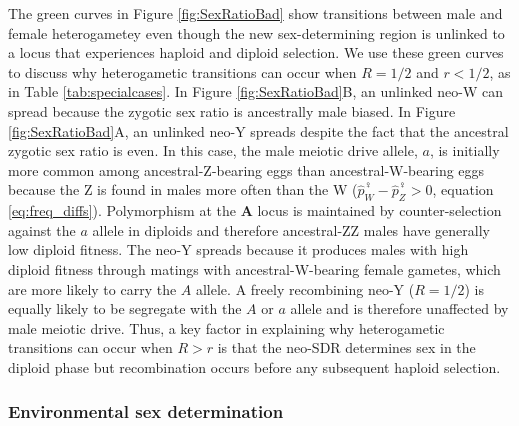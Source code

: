 \documentclass[12pt]{article}
\begin{document}
The green curves in Figure \ref{fig:SexRatioBad} show transitions between male and female heterogametey even though the new sex-determining region is unlinked to a locus that experiences haploid and diploid selection. 
We use these green curves to discuss why heterogametic transitions can occur when $R=1/2$ and $r<1/2$, as in Table \ref{tab:specialcases}.
In Figure \ref{fig:SexRatioBad}B, an unlinked neo-W can spread because the zygotic sex ratio is ancestrally male biased. 
In Figure \ref{fig:SexRatioBad}A, an unlinked neo-Y spreads despite the fact that the ancestral zygotic sex ratio is even. 
In this case, the male meiotic drive allele, $a$, is initially more common among ancestral-Z-bearing eggs than ancestral-W-bearing eggs because the Z is found in males more often than the W ($\hat{p}_{W}^\female-\hat{p}_{Z}^\female>0$, equation \ref{eq:freq_diffs}). 
Polymorphism at the \textbf{A} locus is maintained by counter-selection against the $a$ allele in diploids and therefore ancestral-ZZ males have generally low diploid fitness. 
The neo-Y spreads because it produces males with high diploid fitness through matings with ancestral-W-bearing female gametes, which are more likely to carry the $A$ allele. 
A freely recombining neo-Y ($R=1/2$) is equally likely to be segregate with the $A$ or $a$ allele and is therefore unaffected by male meiotic drive.
Thus, a key factor in explaining why heterogametic transitions can occur when $R>r$ is that the neo-SDR determines sex in the diploid phase but recombination occurs before any subsequent haploid selection. 


\subsubsection*{Environmental sex determination}
\end{document}
